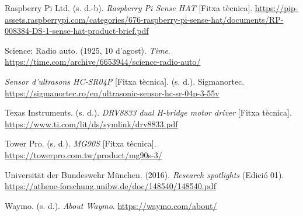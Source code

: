\documentclass[11pt,a4paper]{article}
\begin{document}
{Raspberry Pi Ltd. (s. d.-b). \emph{Raspberry Pi Sense HAT} [Fitxa tècnica]. \url{https://pip-assets.raspberrypi.com/categories/676-raspberry-pi-sense-hat/documents/RP-008384-DS-1-sense-hat-product-brief.pdf}

Science: Radio auto. (1925, 10 d’agost). \emph{Time}. \url{https://time.com/archive/6653944/science-radio-auto/}

\emph{Sensor d’ultrasons HC-SR04P} [Fitxa tècnica]. (s. d.). Sigmanortec. \url{https://sigmanortec.ro/en/ultrasonic-sensor-hc-sr-04p-3-55v}

Texas Instruments. (s. d.). \emph{DRV8833 dual H-bridge motor driver} [Fitxa tècnica]. \url{https://www.ti.com/lit/ds/symlink/drv8833.pdf}

Tower Pro. (s. d.). \emph{MG90S} [Fitxa tècnica]. \url{https://towerpro.com.tw/product/mg90s-3/}

Universität der Bundeswehr München. (2016). \emph{Research spotlights} (Edició 01). \url{https://athene-forschung.unibw.de/doc/148540/148540.pdf}

Waymo. (s. d.). \emph{About Waymo}. \url{https://waymo.com/about/}

}
\end{document}
